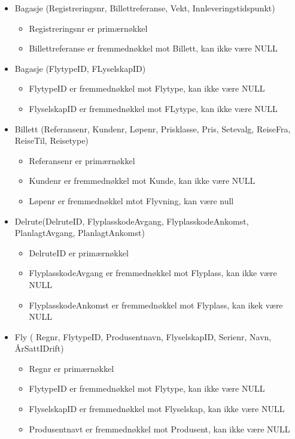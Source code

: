 \documentclass[a4paper,12pt]{article}
\begin{document}
\begin{itemize}

\item Bagasje (Registreringsnr, Billettreferanse, Vekt, Innleveringstidspunkt)
\begin{itemize}
\item Registreringsnr er primærnøkkel
\item Billettreferanse er fremmednøkkel mot Billett, kan ikke være NULL
\end{itemize}

\item Bagasje (FlytypeID, FLyselskapID)
\begin{itemize}
\item FlytypeID er fremmednøkkel mot Flytype, kan ikke være NULL
\item FlyselskapID er fremmednøkkel mot FLytype, kan ikke være NULL
\end{itemize}

\item Billett (Referansenr, Kundenr, Løpenr, Prisklasse, Pris, Setevalg, ReiseFra, ReiseTil, Reisetype)
\begin{itemize}
\item Referansenr er primærnøkkel
\item Kundenr er fremmednøkkel mot Kunde, kan ikke være NULL
\item Løpenr er fremmednøkkel mtot Flyvning, kan være null
\end{itemize}

\item Delrute(DelruteID, FlyplasskodeAvgang, FlyplasskodeAnkomst, PlanlagtAvgang, PlanlagtAnkomst)
\begin{itemize}
\item DelruteID er primærnøkkel
\item FlyplasskodeAvgang er fremmednøkkel mot Flyplass, kan ikke være NULL
\item  FlyplasskodeAnkomst er fremmednøkkel mot Flyplass, kan ikek være NULL
\end{itemize}

\item Fly ( Regnr, FlytypeID, Produsentnavn, FlyselskapID, Serienr, Navn, ÅrSattIDrift)
\begin{itemize}
\item Regnr er primærnøkkel
\item FlytypeID er fremmednøkkel mot Flytype, kan ikke være NULL
\item FlyselskapID er fremmednøkkel mot Flyselskap, kan ikke være NULL
\item Produsentnavt er fremmednøkkel mot Produsent, kan ikke være NULL
\end{itemize}


\end{itemize}
\end{document}

